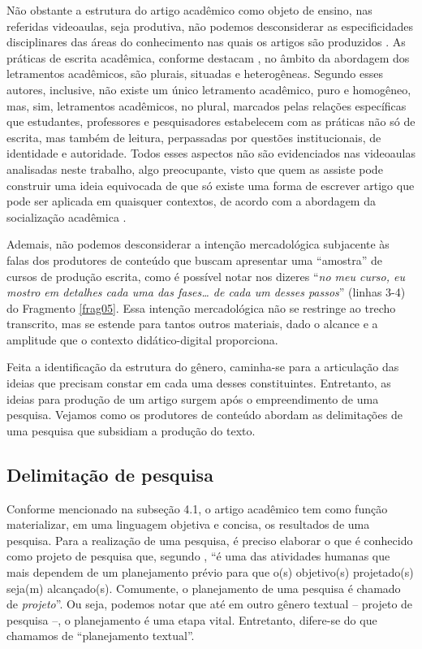 Não obstante a estrutura do artigo acadêmico como objeto de ensino, nas
referidas videoaulas, seja produtiva, não podemos desconsiderar as
especificidades disciplinares das áreas do conhecimento nas quais os
artigos são produzidos \cite{pereira2019}. As práticas de escrita
acadêmica, conforme destacam \cite{lea1998}, no âmbito da abordagem
dos letramentos acadêmicos, são plurais, situadas e heterogêneas.
Segundo esses autores, inclusive, não existe um único letramento
acadêmico, puro e homogêneo, mas, sim, letramentos acadêmicos, no
plural, marcados pelas relações específicas que estudantes, professores
e pesquisadores estabelecem com as práticas não só de escrita, mas
também de leitura, perpassadas por questões institucionais, de
identidade e autoridade. Todos esses aspectos não são evidenciados nas
videoaulas analisadas neste trabalho, algo preocupante, visto que quem
as assiste pode construir uma ideia equivocada de que só existe uma
forma de escrever artigo que pode ser aplicada em quaisquer contextos,
de acordo com a abordagem da socialização acadêmica \cite{lea1998}.

Ademais, não podemos desconsiderar a intenção mercadológica subjacente
às falas dos produtores de conteúdo que buscam apresentar uma
``amostra'' de cursos de produção escrita, como é possível notar nos
dizeres ``\emph{no meu curso, eu mostro em detalhes cada uma das
fases\ldots{} de cada um desses passos}'' (linhas 3-4) do Fragmento \ref{frag05}.
Essa intenção mercadológica não se restringe ao trecho transcrito, mas
se estende para tantos outros materiais, dado o alcance e a amplitude
que o contexto didático-digital proporciona.

Feita a identificação da estrutura do gênero, caminha-se para a
articulação das ideias que precisam constar em cada uma desses
constituintes. Entretanto, as ideias para produção de um artigo surgem
após o empreendimento de uma pesquisa. Vejamos como os produtores de
conteúdo abordam as delimitações de uma pesquisa que subsidiam a
produção do texto.

\subsection{Delimitação de pesquisa}

Conforme mencionado na subseção 4.1, o artigo acadêmico tem como função
materializar, em uma linguagem objetiva e concisa, os resultados de uma
pesquisa. Para a realização de uma pesquisa, é preciso elaborar o que é
conhecido como projeto de pesquisa que, segundo \textcite[p.~51—52, grifo das autoras]{motta-roth2010}, ``é uma das atividades humanas que
mais dependem de um planejamento prévio para que o(s) objetivo(s)
projetado(s) seja(m) alcançado(s). Comumente, o planejamento de uma
pesquisa é chamado de \emph{projeto}''. Ou seja, podemos notar que até
em outro gênero textual -- projeto de pesquisa --, o planejamento é uma
etapa vital. Entretanto, difere-se do que chamamos de ``planejamento
textual''.

